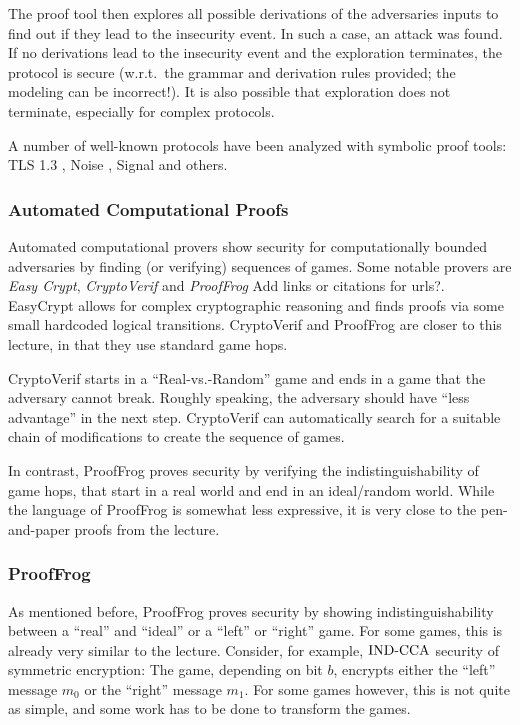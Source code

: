 The proof tool then explores all possible derivations of the adversaries inputs to find out if they lead to the insecurity event.
In such a case, an attack was found.
If no derivations lead to the insecurity event and the exploration terminates, the protocol is secure (w.r.t.\ the grammar and derivation rules provided; the modeling can be incorrect!).
It is also possible that exploration does not terminate, especially for complex protocols.

A number of well-known protocols have been analyzed with symbolic proof tools: TLS 1.3 \cite{CCS:CHHSM17}, Noise \cite{USENIX:GHSJCB20}, Signal \cite{EUROSP:KobBhaBla17} and others.

\subsubsection{Automated Computational Proofs}
Automated computational provers show security for computationally bounded adversaries by finding (or verifying) sequences of games.
Some notable provers are \emph{Easy Crypt}, \emph{CryptoVerif} and \emph{ProofFrog} \alert{Add links or citations for urls?}.
EasyCrypt allows for complex cryptographic reasoning and finds proofs via some small hardcoded logical transitions.
CryptoVerif and ProofFrog are closer to this lecture, in that they use standard game hops.

CryptoVerif starts in a ``Real-vs.-Random'' game and ends in a game that the adversary cannot break.
Roughly speaking, the adversary should have ``less advantage'' in the next step.
CryptoVerif can automatically search for a suitable chain of modifications to create the sequence of games.

In contrast, ProofFrog proves security by verifying the indistinguishability of game hops, that start in a real world and end in an ideal/random world.
While the language of ProofFrog is somewhat less expressive, it is very close to the pen-and-paper proofs from the lecture.

\subsubsection{ProofFrog}
As mentioned before, ProofFrog \cite{prooffrog} proves security by showing indistinguishability between a ``real'' and ``ideal'' or a ``left'' or ``right'' game.
For some games, this is already very similar to the lecture. 
Consider, for example, ${\mathrm{IND}\text{-}\mathrm{CCA}}$ security of symmetric encryption:
The game, depending on bit $b$, encrypts either the ``left'' message $m_0$ or the ``right'' message $m_1$.
For some games however, this is not quite as simple, and some work has to be done to transform the games.


